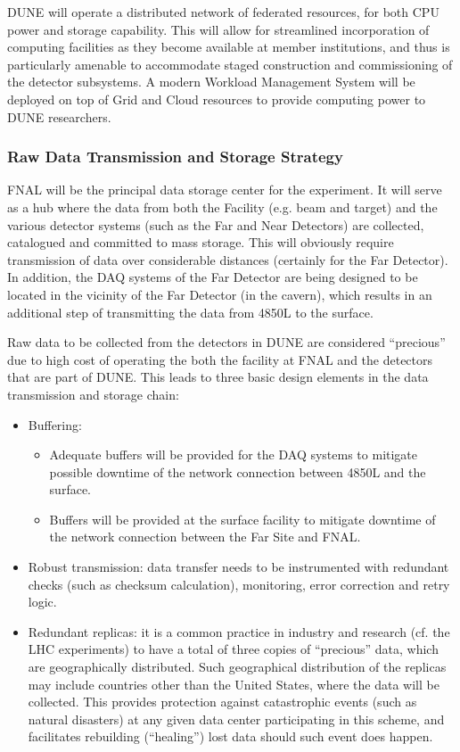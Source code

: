 DUNE will operate a distributed network of federated resources, for
both CPU power and storage capability. This will allow for streamlined
incorporation of computing facilities as they become available at
member institutions, and thus is particularly amenable to accommodate
staged construction and commissioning of the detector subsystems. A
modern Workload Management System will be deployed on top of Grid and
Cloud resources to provide computing power to DUNE researchers.

\subsubsection{Raw Data Transmission and Storage Strategy}
FNAL will be the principal data storage center for the experiment. It
will serve as a hub where the data from both the Facility (e.g. beam
and target) and the various detector systems (such as the Far and Near
Detectors) are collected, catalogued and committed to mass
storage. This will obviously require transmission of data over
considerable distances (certainly for the Far Detector). In addition,
the DAQ systems of the Far Detector are being designed to be located
in the vicinity of the Far Detector (in the cavern), which results in
an additional step of transmitting the data from 4850L to the surface.

Raw data to be collected from the detectors in DUNE are considered
``precious'' due to high cost of operating the both the facility at
FNAL and the detectors that are part of DUNE. This leads to three
basic design elements in the data transmission and storage chain:
\begin{itemize}
\item Buffering:
\begin{itemize}
\item Adequate buffers will be provided for the DAQ systems to
  mitigate possible downtime of the network connection between 4850L
  and the surface.
\item Buffers will be provided at the surface facility to mitigate
  downtime of the network connection between the Far Site and FNAL.
\end{itemize}
\item Robust transmission: data transfer needs to be instrumented with
  redundant checks (such as checksum calculation), monitoring, error
  correction and retry logic.
\item Redundant replicas: it is a common practice in industry and
  research (cf. the LHC experiments) to have a total of three copies
  of ``precious'' data, which are geographically distributed.  Such
  geographical distribution of the replicas may include countries
  other than the United States, where the data will be collected.
  This provides protection against catastrophic events (such as
  natural disasters) at any given data center participating in this
  scheme, and facilitates rebuilding (``healing'') lost data should
  such event does happen.
\end{itemize}


